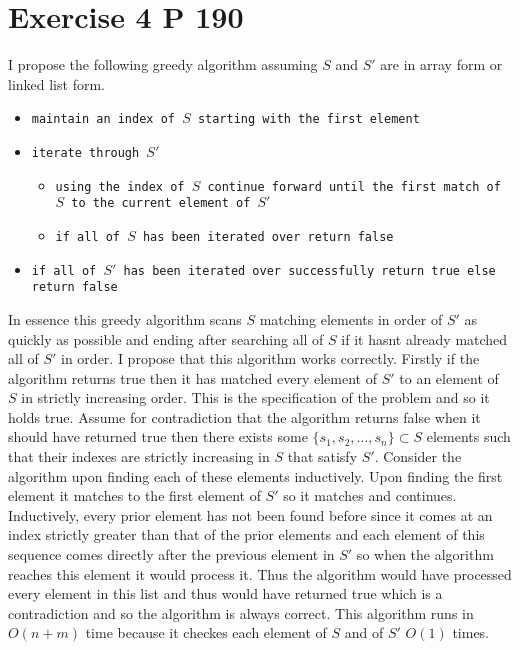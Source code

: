 \documentclass{amsart}
\begin{document}
\section{Exercise 4 P 190}
I propose the following greedy algorithm assuming $S$ and $S'$ are in array form or linked list form.
{\small
    \begin{itemize}
        \item \texttt{maintain an index of $S$ starting with the first element}
        \item \texttt{iterate through $S'$ }
            \begin{itemize}
                \item \texttt{using the index of $S$ continue forward until the first match of $S$ to the current
                    element of $S'$ }
                \item \texttt{if all of $S$ has been iterated over return false}
            \end{itemize}
        \item \texttt{if all of $S'$ has been iterated over successfully return true else return false}
    \end{itemize}
}
In essence this greedy algorithm scans $S$ matching elements in order of $S'$ as quickly as possible and ending after searching all of $S$ if
it hasnt already matched all of $S'$ in order. I propose that this algorithm works correctly.
Firstly if the algorithm returns true then it has matched every element of  $S'$ to an element of $S$ in strictly increasing order. This is
the specification of the problem and so it holds true.
Assume for contradiction that the algorithm returns false when it should have returned true then there exists some $\{s_1,s_2,...,s_n\} \subset S$ elements
such that their indexes are strictly increasing in $S$ that satisfy $S'$. Consider the algorithm upon finding each of these elements inductively. Upon finding the first element
it matches to the first element of $S'$ so it matches and continues. Inductively, every prior element has not been found before since it comes at an index strictly greater than that of the prior elements
and each element of this sequence comes directly after the previous element in $S'$ so when the algorithm reaches this element it would process it. Thus the algorithm would have processed every element in this list
and thus would have returned true which is a contradiction and so the algorithm is always correct.
This algorithm runs in $O(n+m)$ time because it checkes each element of $S$ and of $S'$ $O(1)$ times.
\end{document}
